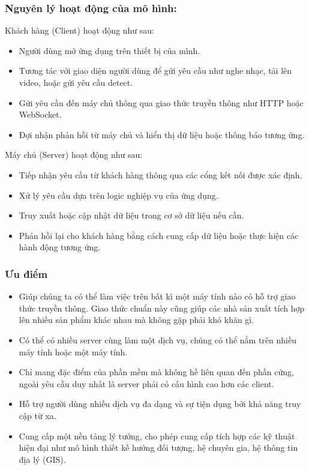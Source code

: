 \documentclass[a4paper]{article}
\begin{document}
\subsubsection{Nguyên lý hoạt động của mô hình:}
Khách hàng (Client) hoạt động như sau:
\begin{itemize}
    \item Người dùng mở ứng dụng trên thiết bị của mình.
    \item Tương tác với giao diện người dùng để gửi yêu cầu như nghe nhạc, tải lên video, hoặc gửi yêu cầu detect.
    \item Gửi yêu cầu đến máy chủ thông qua giao thức truyền thông như HTTP hoặc WebSocket.
    \item Đợi nhận phản hồi từ máy chủ và hiển thị dữ liệu hoặc thông báo tương ứng.

\end{itemize}
Máy chủ (Server) hoạt động như sau:
\begin{itemize}
    \item Tiếp nhận yêu cầu từ khách hàng thông qua các cổng kết nối được xác định.
    \item Xử lý yêu cầu dựa trên logic nghiệp vụ của ứng dụng.
    \item Truy xuất hoặc cập nhật dữ liệu trong cơ sở dữ liệu nếu cần.
    \item Phản hồi lại cho khách hàng bằng cách cung cấp dữ liệu hoặc thực hiện các hành động tương ứng.
\end{itemize}

\subsubsection{Ưu điểm}
\begin{itemize}
    \item Giúp chúng ta có thể làm việc trên bất kì một máy tính nào có hỗ trợ giao thức truyền thông. Giao thức chuẩn này cũng giúp các nhà sản xuất tích hợp lên nhiều sản phẩm khác nhau mà không gặp phải khó khăn gì.
    \item Có thể có nhiều server cùng làm một dịch vụ, chúng có thể nằm trên nhiều máy tính hoặc một máy tính.
    \item Chỉ mang đặc điểm của phần mềm mà không hề liên quan đến phần cứng, ngoài yêu cầu duy nhất là server phải có cấu hình cao hơn các client.
    \item Hỗ trợ người dùng nhiều dịch vụ đa dạng và sự tiện dụng bởi khả năng truy cập từ xa.
    \item Cung cấp một nền tảng lý tưởng, cho phép cung cấp tích hợp các kỹ thuật hiện đại như mô hình thiết kế hướng đối tượng, hệ chuyên gia, hệ thông tin địa lý (GIS).
\end{itemize}
\end{document}
